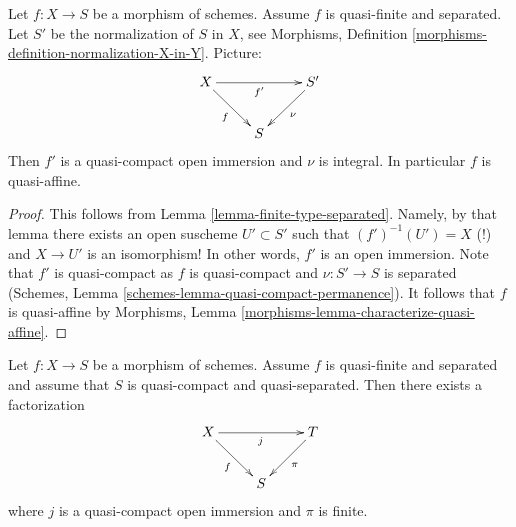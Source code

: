 \begin{lemma}
\label{lemma-quasi-finite-separated-quasi-affine}
Let $f : X \to S$ be a morphism of schemes.
Assume $f$ is quasi-finite and separated.
Let $S'$ be the normalization of $S$ in $X$, see
Morphisms, Definition \ref{morphisms-definition-normalization-X-in-Y}.
Picture:
$$
\xymatrix{
X \ar[rd]_f \ar[rr]_{f'} & & S' \ar[ld]^\nu \\
& S &
}
$$
Then $f'$ is a quasi-compact open immersion and $\nu$ is integral.
In particular $f$ is quasi-affine.
\end{lemma}

\begin{proof}
This follows from Lemma \ref{lemma-finite-type-separated}. Namely, by
that lemma there exists an open suscheme $U' \subset S'$ such that
$(f')^{-1}(U') = X$ (!) and $X \to U'$ is an isomorphism! In other
words, $f'$ is an open immersion. Note that $f'$ is quasi-compact as
$f$ is quasi-compact and $\nu : S' \to S$ is separated
(Schemes, Lemma \ref{schemes-lemma-quasi-compact-permanence}).
It follows that $f$ is quasi-affine by
Morphisms, Lemma \ref{morphisms-lemma-characterize-quasi-affine}.
\end{proof}

\begin{lemma}
\label{lemma-quasi-finite-separated-pass-through-finite}
Let $f : X \to S$ be a morphism of schemes.
Assume $f$ is quasi-finite and separated and assume that
$S$ is quasi-compact and quasi-separated. Then there exists
a factorization
$$
\xymatrix{
X \ar[rd]_f \ar[rr]_j & & T \ar[ld]^\pi \\
& S &
}
$$
where $j$ is a quasi-compact open immersion and $\pi$ is finite.
\end{lemma}

